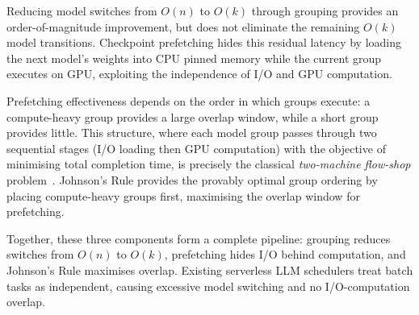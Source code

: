 \documentclass[logo,bsc,singlespacing,parskip,online]{infthesis}
\begin{document}
Reducing model switches from $O(n)$ to $O(k)$ through grouping provides an order-of-magnitude improvement, but does not eliminate the remaining $O(k)$ model transitions. Checkpoint prefetching hides this residual latency by loading the next model's weights into CPU pinned memory while the current group executes on GPU, exploiting the independence of I/O and GPU computation.

Prefetching effectiveness depends on the order in which groups execute: a compute-heavy group provides a large overlap window, while a short group provides little. This structure, where each model group passes through two sequential stages (I/O loading then GPU computation) with the objective of minimising total completion time, is precisely the classical \textit{two-machine flow-shop} problem~\cite{johnson1954optimal}. Johnson's Rule provides the provably optimal group ordering by placing compute-heavy groups first, maximising the overlap window for prefetching.

Together, these three components form a complete pipeline: grouping reduces switches from $O(n)$ to $O(k)$, prefetching hides I/O behind computation, and Johnson's Rule maximises overlap. Existing serverless LLM schedulers treat batch tasks as independent, causing excessive model switching and no I/O-computation overlap.
\end{document}
